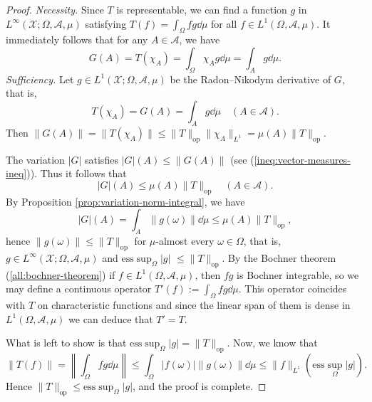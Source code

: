 \documentclass[a4paper, 12pt]{article}
\begin{document}
\begin{proof} \emph{Necessity.} Since $T$ is representable, we can find a function $g$ in $L^{\infty}(\mathcal{X}; \Omega, \mathcal{A}, \mu)$ satisfying $T(f) = \int_{\Omega} f g \dd{\mu}$ for all $f \in L^1(\Omega, \mathcal{A}, \mu).$ It immediately follows that for any $A \in \mathcal{A}$, we have
$$G(A) = T(\chi_{A}) = \int_{\Omega} \chi_{A} g \dd{\mu} = \int_{A} g \dd{\mu}.$$
\emph{Sufficiency.} Let $g \in L^1(\mathcal{X}; \Omega, \mathcal{A}, \mu)$ be the Radon\---Nikodym derivative of $G$, that is,
$$T(\chi_{A})= G(A) = \int_{A} g \dd{\mu} \quad (A \in \mathcal{A}).$$
Then $\| G(A) \| = \| T(\chi_{A}) \| \leqslant \| T \|_{\mathrm{op}} \| \chi_{A} \|_{L^1} =  \mu(A)\| T \|_{\mathrm{op}}.$

The variation $|G|$ satisfies $|G|(A) \leqslant \| G(A) \|$ (see (\ref{ineq:vector-measures-ineq})). Thus it follows that
$$|G|(A) \leqslant \mu(A)\| T \|_{\mathrm{op}} \quad (A \in \mathcal{A}).$$
By Proposition \ref{prop:variation-norm-integral}, we have
$$|G|(A) = \int_{A} \| g(\omega) \| \dd{\mu} \leqslant \mu(A)\| T \|_{\mathrm{op}},$$
hence $\| g(\omega) \| \leqslant \| T \|_{\mathrm{op}}$ for $\mu$-almost every $\omega \in \Omega$, that is, $g \in L^{\infty}(\mathcal{X}; \Omega, \mathcal{A}, \mu)$ and $\mathrm{ess} \sup_{\Omega} |g|$ $\leqslant \| T \|_{\mathrm{op}}$.
By the Bochner theorem (\ref{all:bochner-theorem}) if $f \in L^1(\Omega, \mathcal{A}, \mu)$, then $fg$ is Bochner integrable, so we may define a continuous operator $T'(f) := \int_{\Omega} fg \dd{\mu}$. This operator coincides with $T$ on characteristic functions and since the linear span of them is dense in $L^1(\Omega, \mathcal{A}, \mu)$ we can deduce that $T' = T$.

What is left to show is that $\mathrm{ess} \sup_{\Omega} |g| = \| T \|_{\mathrm{op}}$. Now, we know that
$$\|T(f) \| = \left \| \int_{\Omega} f g \dd{\mu} \right \|  \leqslant \int_{\Omega} |f(\omega)|\| g(\omega) \| \dd{\mu} \leqslant  \| f \|_{L^1}\left( \mathrm{ess} \sup_{\Omega} |g| \right).$$
Hence $\| T \|_{\mathrm{op}} \leqslant  \mathrm{ess} \sup_{\Omega} |g|$, and the proof is complete.
\end{proof}
\end{document}
